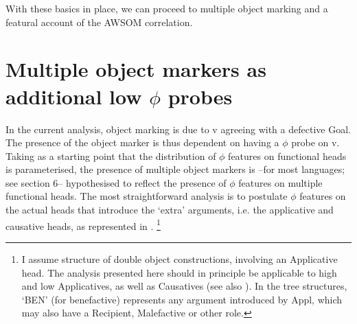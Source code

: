 \documentclass[output=paper
,modfonts
,nonflat]{langsci/langscibook}
\begin{document}
With these basics in place, we can proceed to multiple object marking and a featural account of the AWSOM correlation.

\section{ Multiple object markers as additional low $\phi$ probes}

In the current analysis, object marking is due to v agreeing with a defective Goal. The presence of the object marker is thus dependent on having a $\phi$ probe on v. Taking as a starting point that the distribution of $\phi$ features on functional heads is parameterised, the presence of multiple object markers is –for most languages; see section 6– hypothesised to reflect the presence of $\phi$ features on multiple functional heads. The most straightforward analysis is to postulate $\phi$ features on the actual heads that introduce the ‘extra’ arguments, i.e. the applicative and causative heads, as represented in .{} \footnote{I assume  structure of double object constructions, involving an Applicative head. The analysis presented here should in principle be applicable to high and low Applicatives, as well as Causatives (see also \citealt{Van_der_Wal2017}). In the tree structures, ‘BEN’ (for benefactive) represents any argument introduced by Appl, which may also have a Recipient, Malefactive or other role.}
\end{document}
